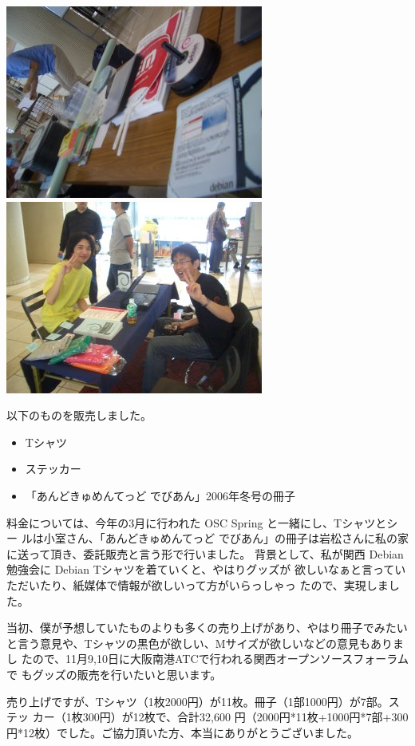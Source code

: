\documentclass[mingoth,a4paper]{jsarticle}
\begin{document}
\includegraphics{image200708/booth2.jpg}
\includegraphics{image200708/booth.jpg}

以下のものを販売しました。

\begin{itemize}
 \item Tシャツ
 \item ステッカー
 \item 「あんどきゅめんてっど でびあん」2006年冬号の冊子
\end{itemize}

料金については、今年の3月に行われた OSC Spring と一緒にし、Tシャツとシー
ルは小室さん、「あんどきゅめんてっど でびあん」の冊子は岩松さんに私の家
に送って頂き、委託販売と言う形で行いました。
背景として、私が関西 Debian 勉強会に Debian Tシャツを着ていくと、やはりグッズが
欲しいなぁと言っていただいたり、紙媒体で情報が欲しいって方がいらっしゃっ
たので、実現しました。

当初、僕が予想していたものよりも多くの売り上げがあり、やはり冊子でみたい
と言う意見や、Tシャツの黒色が欲しい、Mサイズが欲しいなどの意見もありまし
たので、11月9,10日に大阪南港ATCで行われる関西オープンソースフォーラムで
もグッズの販売を行いたいと思います。

売り上げですが、Tシャツ（1枚2000円）が11枚。冊子（1部1000円）が7部。ステッ
カー（1枚300円）が12枚で、合計32,600
円（2000円*11枚+1000円*7部+300円*12枚）でした。ご協力頂いた方、本当にありがとうございました。
\end{document}
